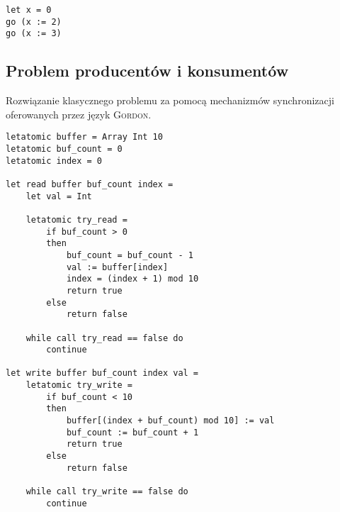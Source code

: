 \documentclass{documentation}
\begin{document}
\begin{verbatim}
let x = 0
go (x := 2)
go (x := 3)
\end{verbatim}


\subsection{Problem producentów i konsumentów}
\noindent Rozwiązanie klasycznego problemu za pomocą mechanizmów synchronizacji
oferowanych przez język \textsc{Gordon}.

\begin{verbatim}
letatomic buffer = Array Int 10
letatomic buf_count = 0
letatomic index = 0

let read buffer buf_count index = 
    let val = Int

    letatomic try_read =
        if buf_count > 0
        then
            buf_count = buf_count - 1
            val := buffer[index]
            index = (index + 1) mod 10
            return true
        else
            return false
        
    while call try_read == false do
        continue

let write buffer buf_count index val =
    letatomic try_write =
        if buf_count < 10
        then
            buffer[(index + buf_count) mod 10] := val
            buf_count := buf_count + 1
            return true
        else
            return false

    while call try_write == false do
        continue

\end{verbatim}


\begin{verbatim}

\end{verbatim}
\end{document}
